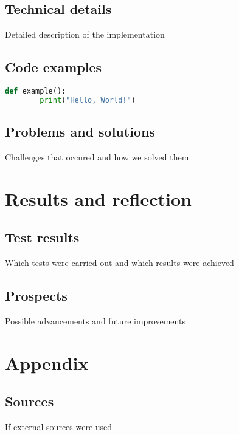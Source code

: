 \documentclass[a4paper, 12pt]{article}
\begin{document}
\subsection{Technical details}
Detailed description of the implementation

\subsection{Code examples}
\begin{lstlisting}[language=Python, caption=example code in Python]
	def example():
		print("Hello, World!")
\end{lstlisting}

\subsection{Problems and solutions}
Challenges that occured and how we solved them

\section{Results and reflection}
\subsection{Test results}
Which tests were carried out and which results were achieved

\subsection{Prospects}
Possible advancements and future improvements

\section{Appendix}
\subsection{Sources}
If external sources were used
\end{document}
